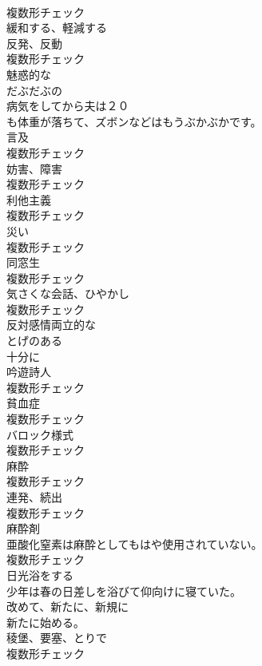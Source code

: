 \documentclass[8pt]{extreport}
\begin{document}
\begin{CJK}{UTF8}{min}
\\	複数形チェック
\\	[動詞]	緩和する、軽減する	
\\	[名詞]	反発、反動	
\\	複数形チェック
\\	[形容詞]	魅惑的な	
\\	[形容詞]	だぶだぶの	
\\	病気をしてから夫は２０
\\	も体重が落ちて、ズボンなどはもうぶかぶかです。	
\\	[名詞]	言及	
\\	複数形チェック
\\	[名詞]	妨害、障害	
\\	複数形チェック
\\	[名詞]	利他主義	
\\	複数形チェック
\\	[名詞]	災い	
\\	複数形チェック
\\	[名詞]	同窓生	
\\	複数形チェック
\\	[名詞]	気さくな会話、ひやかし	
\\	複数形チェック
\\	[形容詞]	反対感情両立的な	
\\	[形容詞]	とげのある	
\\	[副詞]	十分に	
\\	[名詞]	吟遊詩人	
\\	複数形チェック
\\	[名詞]	貧血症	
\\	複数形チェック
\\	[名詞]	バロック様式	
\\	複数形チェック
\\	[名詞]	麻酔	
\\	複数形チェック
\\	[名詞]	連発、続出	
\\	複数形チェック
\\	[名詞]	麻酔剤	
\\	亜酸化窒素は麻酔としてもはや使用されていない。	
\\	複数形チェック
\\	[動詞]	日光浴をする	
\\	少年は春の日差しを浴びて仰向けに寝ていた。	
\\	[副詞]	改めて、新たに、新規に	
\\	新たに始める｡	
\\	[名詞]	稜堡、要塞、とりで	
\\	複数形チェック

\end{CJK}
\end{document}
